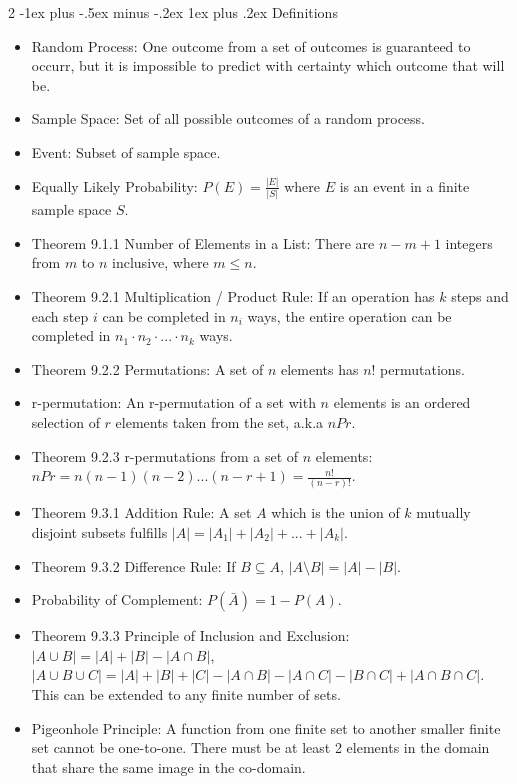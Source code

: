 \documentclass[10pt, portrait]{article}
\makeatletter
\renewcommand{\subsection}{\@startsection{subsection}{3}{0mm}%
                                {-1ex plus -.5ex minus -.2ex}%
                                {1ex plus .2ex}%
                                {\normalfont\small\bfseries}}%
\makeatother
\begin{document}
\begin{multicols*}{2}
\subsection{Definitions}
\begin{itemize}
    \item Random Process: One outcome from a set of outcomes is guaranteed to occurr, but it is impossible to predict with certainty which outcome that will be.
    \item Sample Space: Set of all possible outcomes of a random process.
    \item Event: Subset of sample space.
    \item Equally Likely Probability: $P(E) = \frac{|E|}{|S|}$ where $E$ is an event in a finite sample space $S$.
    \item Theorem 9.1.1 Number of Elements in a List: There are $n-m+1$ integers from $m$ to $n$ inclusive, where $m \leq n$.
    \item Theorem 9.2.1 Multiplication / Product Rule: If an operation has $k$ steps and each step $i$ can be completed in $n_i$ ways, the entire operation can be completed in $n_1 \cdot n_2 \cdot ... \cdot n_k$ ways.
    \item Theorem 9.2.2 Permutations: A set of $n$ elements has $n!$ permutations.
    \item r-permutation: An r-permutation of a set with $n$ elements is an ordered selection of $r$ elements taken from the set, a.k.a $nPr$.
    \item Theorem 9.2.3 r-permutations from a set of $n$ elements: $nPr = n(n-1)(n-2)...(n-r+1) = \frac{n!}{(n-r)!}$.
    \item Theorem 9.3.1 Addition Rule: A set $A$ which is the union of $k$ mutually disjoint subsets fulfills $|A|=|A_1|+|A_2|+...+|A_k|$.
    \item Theorem 9.3.2 Difference Rule: If $B \subseteq A$, $|A \setminus B| = |A|-|B|$.
    \item Probability of Complement: $P(\bar{A})=1-P(A)$.
    \item Theorem 9.3.3 Principle of Inclusion and Exclusion: $|A \cup B| = |A|+|B|-|A \cap B|$, $|A \cup B \cup C|=|A|+|B|+|C|-|A \cap B|-|A \cap C|-|B \cap C|+|A \cap B \cap C|$. This can be extended to any finite number of sets.
    \item Pigeonhole Principle: A function from one finite set to another smaller finite set cannot be one-to-one. There must be at least 2 elements in the domain that share the same image in the co-domain.

\end{itemize}
\end{multicols*}
\end{document}
